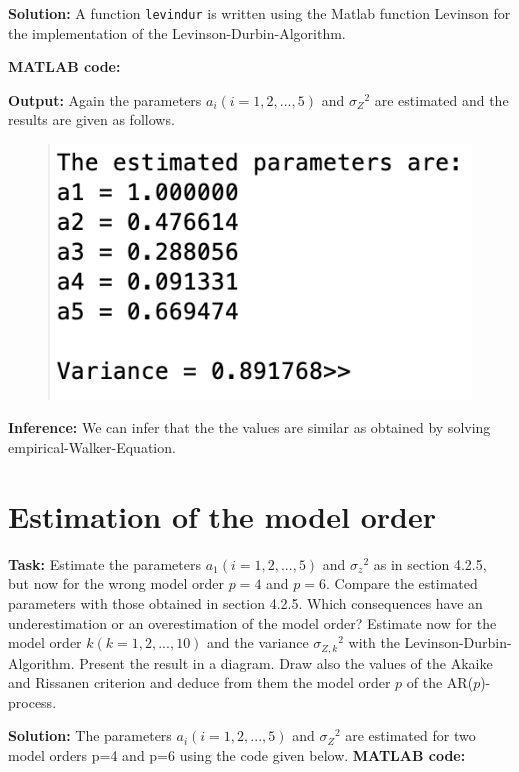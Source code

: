  \noindent \textbf{Solution:} A function \texttt{levindur} is written using the Matlab function Levinson for the implementation of the Levinson-Durbin-Algorithm.
 
 \noindent \textbf{MATLAB code:}


 \noindent \textbf{Output:}
 \noindent Again the parameters $a_i(i=1,2,...,5)$ and ${\sigma_Z}^2$ are estimated and the results are given as follows.
\begin{figure}[H]
\centering
{\includegraphics[scale=0.65]{ass5_1.png}}
\end{figure}

\noindent \textbf{Inference:} We can infer that the the values are similar as obtained by solving empirical-Walker-Equation.

\section{ Estimation of the model order  }  \label{ Estimation of the model order }
\noindent \textbf{Task:} Estimate the parameters $a_1(i=1,2,...,5)$ and ${\sigma_z}^2$ as in section 4.2.5, but now for the wrong model order $p = 4$ and $p = 6.$ Compare the estimated parameters with those obtained in section 4.2.5. Which consequences have an underestimation or an overestimation of the model order? Estimate
now for the model order $k(k=1,2,...,10)$ and the variance ${\sigma_{Z,k}}^2$ with the Levinson-Durbin-Algorithm.
Present the result in a diagram. Draw also the values of the Akaike and Rissanen criterion and deduce from them the model order $p$ of the AR($p$)-process. 



\noindent \textbf{Solution:} The parameters $a_i(i = 1, 2,...,5)$ and ${\sigma_Z}^2$ are estimated for two model orders p=4 and p=6 using the code given below.
\noindent \textbf{MATLAB code:}


